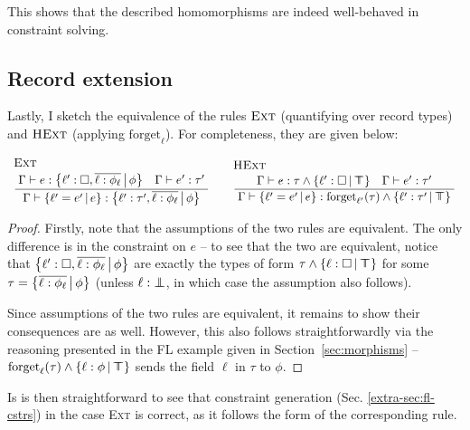 This shows that the described homomorphisms are indeed well-behaved in constraint solving.

\needspace{6em}
\subsection{Record extension}

Lastly, I sketch the equivalence of the rules $\textsc{Ext}$ (quantifying over record types) and $\textsc{HExt}$ (applying $\mathrm{forget}_\ell$). For completeness, they are given below:
$$
\irule{Ext}
    {\Gamma \vdash e : \flext{\ell' : \flabsent, \overline{\ell : \phi_\ell}}{\phi} \quad \Gamma \vdash e' : \tau'}
    {\Gamma \vdash \flext{\ell' = e'}{e} : \flext{\ell' : \tau', \overline{\ell : \phi_\ell}}{\phi}}
\quad 
\irule{HExt}{\Gamma \vdash e : \tau \meet \flext{\ell' : \flabsent}{\flftop} \quad \Gamma \vdash e' : \tau'}{\Gamma \vdash \flext{\ell' = e'}{e} : \mathrm{forget}_{\ell'}(\tau) \meet \flext{\ell' : \tau'}{\flftop}}
$$
\begin{proof}
    Firstly, note that the assumptions of the two rules are equivalent. The only difference is in the constraint on $e$ -- to see that the two are equivalent, notice that $\flext{\ell' : \flabsent, \overline{\ell : \phi_\ell}}{\phi}$ are exactly the types of form $\tau \meet \flext{\ell : \flabsent}{\flftop}$ for some $\tau = \flext{\overline{\ell : \phi_\ell}}{\phi}$ (unless $\ell : \bot \!\!\!\! \bot$, in which case the assumption also follows).

    Since assumptions of the two rules are equivalent, it remains to show their consequences are as well. However, this also follows straightforwardly via the reasoning presented in the FL example given in Section~\ref{sec:morphisms} -- $\mathrm{forget}_\ell(\tau) \meet \flext{\ell : \phi}{\flftop}$ sends the field $\ell$ in $\tau$ to $\phi$. 
\end{proof}

Is is then straightforward to see that constraint generation (Sec. \ref{extra-sec:fl-cstrs}) in the case \textsc{Ext} is correct, as it follows the form of the corresponding rule.